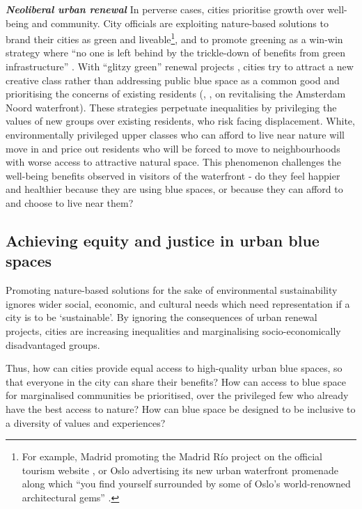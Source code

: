 \documentclass{article}
\newcommand{\bisection}[1]{\textbf{\textit{#1}}}
\begin{document}
\bisection{Neoliberal urban renewal} 
In perverse cases, cities prioritise growth over well-being and community. 
City officials are exploiting nature-based solutions to brand their cities as green and liveable\footnote{For example, Madrid promoting the Madrid Río project on the official tourism website \parencite{madridrio}, or Oslo advertising its new urban waterfront promenade along which ``you find yourself surrounded by some of Oslo's world-renowned architectural gems'' \parencite{visitoslo}.}, and to promote greening as a win-win strategy where ``no one is left behind by the trickle-down of benefits from green infrastructure'' \parencite{anguelovski2021green}.
With ``glitzy green'' renewal projects \parencite{anguelovski2021green}, cities try to attract a new creative class rather than addressing public blue space as a common good and prioritising the concerns of existing residents (\cite{wessells2014urban}, \cite{anguelovski2020expanding}, \cite{del2021dismantling} on revitalising the Amsterdam Noord waterfront).
These strategies perpetuate inequalities by privileging the values of new groups over existing residents, who risk facing displacement. White, environmentally privileged upper classes who can afford to live near nature will move in and price out residents who will be forced to move to neighbourhoods with worse access to attractive natural space. This phenomenon challenges the well-being benefits observed in visitors of the waterfront - do they feel happier and healthier because they are using blue spaces, or because they can afford to and choose to live near them?

\subsection{Achieving equity and justice in urban blue spaces}

Promoting nature-based solutions for the sake of environmental sustainability ignores wider social, economic, and cultural needs which need representation if a city is to be `sustainable'. By ignoring the consequences of urban renewal projects, cities are increasing inequalities and marginalising socio-economically disadvantaged groups. 

Thus, how can cities provide equal access to high-quality urban blue spaces, so that everyone in the city can share their benefits?
How can access to blue space for marginalised communities be prioritised, over the privileged few who already have the best access to nature?
How can blue space be designed to be inclusive to a diversity of values and experiences? 
\end{document}
